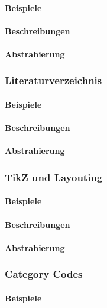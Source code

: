 \paragraph*{Beispiele}
\paragraph*{Beschreibungen}
\paragraph*{Abstrahierung}

\subsubsection{Literaturverzeichnis}\label{problems:bibtex}
\paragraph*{Beispiele}
\paragraph*{Beschreibungen}
\paragraph*{Abstrahierung}


\subsubsection{TikZ und Layouting}\label{problems:layouting}
\paragraph*{Beispiele}
\paragraph*{Beschreibungen}
\paragraph*{Abstrahierung}

\subsubsection{Category Codes}\label{problems:catcode}
\paragraph*{Beispiele}
